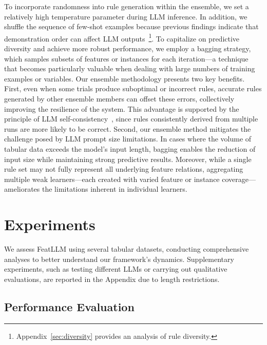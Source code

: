 To incorporate randomness into rule generation within the ensemble, we set a relatively high temperature parameter during LLM inference. In addition, we shuffle the sequence of few-shot examples because previous findings indicate that demonstration order can affect LLM outputs~\cite{lu2022fantastically}\footnote{Appendix~\ref{sec:diversity} provides an analysis of rule diversity.}. To capitalize on predictive diversity and achieve more robust performance, we employ a bagging strategy, which samples subsets of features or instances for each iteration—a technique that becomes particularly valuable when dealing with large numbers of training examples or variables. Our ensemble methodology presents two key benefits. First, even when some trials produce suboptimal or incorrect rules, accurate rules generated by other ensemble members can offset these errors, collectively improving the resilience of the system. This advantage is supported by the principle of LLM self-consistency~\cite{wang2022self}, since rules consistently derived from multiple runs are more likely to be correct. Second, our ensemble method mitigates the challenge posed by LLM prompt size limitations. In cases where the volume of tabular data exceeds the model’s input length, bagging enables the reduction of input size while maintaining strong predictive results. Moreover, while a single rule set may not fully represent all underlying feature relations, aggregating multiple weak learners—each created with varied feature or instance coverage—ameliorates the limitations inherent in individual learners.

\section{Experiments}
We assess \textsf{FeatLLM} using several tabular datasets, conducting comprehensive analyses to better understand our framework's dynamics. Supplementary experiments, such as testing different LLMs or carrying out qualitative evaluations, are reported in the Appendix due to length restrictions.

\subsection{Performance Evaluation}
